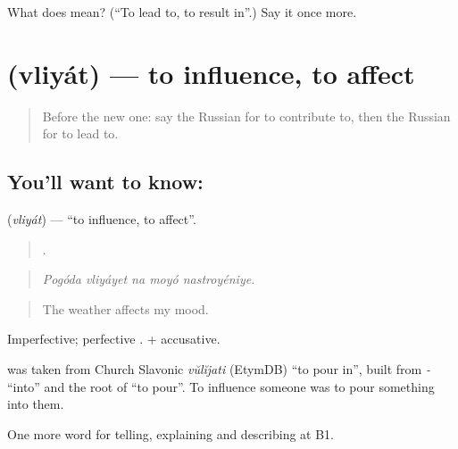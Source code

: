 \begin{tcolorbox}[breakable,colback=teal!4,colframe=teal!35!black,title={Before you move on}]
What does  mean? (\textquotedblleft{}To lead to, to result in\textquotedblright{}.) Say it once more.
\end{tcolorbox}
\section[\texorpdfstring{\ru{влиять} (vliyát)}{влиять (vliyát)}]{ (vliyát) — to influence, to affect}

\label{lesson:RU-C349-vliyat}



\begin{quote}
Before the new one: say the Russian for to contribute to, then the Russian for to lead to.
\end{quote}

\subsection*{You'll want to know: }
\textbf{} (\emph{vliyát}) — \textquotedblleft{}to influence, to affect\textquotedblright{}.

\begin{quote}
    .
\end{quote}

\begin{quote}
\emph{Pogóda vliyáyet na moyó nastroyéniye.}
\end{quote}

\begin{quote}
The weather affects my mood.
\end{quote}

Imperfective; perfective \emph{}. \emph{ } + accusative.

\begin{cousinweb}
\textbf{} was taken from Church Slavonic \emph{vŭlĭjati} (EtymDB) \textquotedblleft{}to pour in\textquotedblright{}, built from \emph{-} \textquotedblleft{}into\textquotedblright{} and the root of \emph{} \textquotedblleft{}to pour\textquotedblright{}. To influence someone was to pour something into them.
\end{cousinweb}

\begin{grammarlens}[title={What you've built}]
One more word for telling, explaining and describing at B1.
\end{grammarlens}

